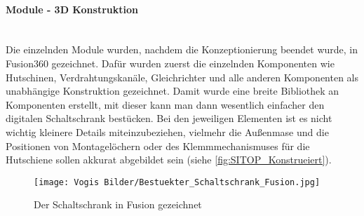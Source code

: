     \paragraph{Module - 3D Konstruktion}\mbox{}\\
    Die einzelnden Module wurden, nachdem die Konzeptionierung beendet wurde, in Fusion360 gezeichnet. Dafür wurden zuerst die einzelnden Komponenten wie Hutschinen, Verdrahtungskanäle, Gleichrichter und alle anderen Komponenten als unabhängige Konstruktion gezeichnet. Damit wurde eine breite Bibliothek an Komponenten erstellt, mit dieser kann man dann wesentlich einfacher den digitalen Schaltschrank bestücken. Bei den jeweiligen Elementen ist es nicht wichtig kleinere Details miteinzubeziehen, vielmehr die Außenmase und die Positionen von Montagelöchern oder des Klemmmechanismuses für die Hutschiene sollen akkurat abgebildet sein (siehe \ref{fig:SITOP_Konstrueiert}).
    \begin{wrapfigure}{r}{0.4\textwidth}
        \vspace{0px}
        \texttt{[image: Vogis Bilder/Bestuekter\_Schaltschrank\_Fusion.jpg]}
        \caption{Der Schaltschrank in Fusion gezeichnet}
        \vspace{-30px}
        \label{fig:Schaltschrank_bestueckt_Fusion}
    \end{wrapfigure}
